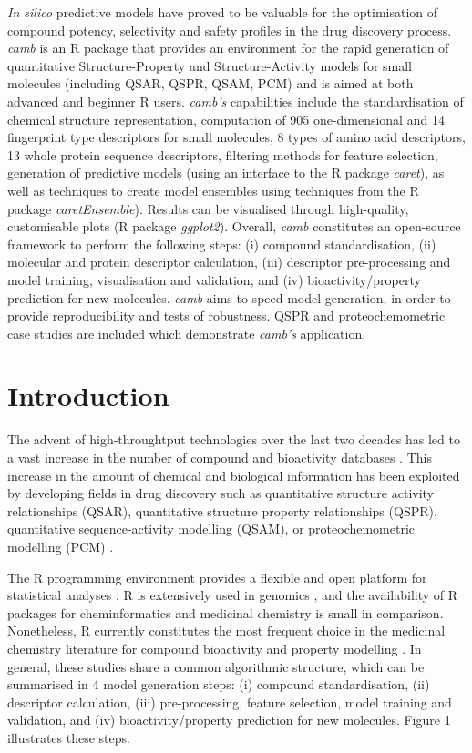 \documentclass[twoside,a4wide,10pt]{article}
\begin{document}
{\it In silico} predictive models have proved to be valuable for the optimisation of compound potency, selectivity and safety profiles in the drug discovery process.
{\it camb} is an R package that provides an environment for the rapid generation of quantitative Structure-Property and Structure-Activity models for small molecules (including QSAR, QSPR, QSAM, PCM) and is aimed at both advanced and beginner R users.
{\it camb's} capabilities include the standardisation of chemical structure representation, computation of 905 one-dimensional and 14 fingerprint type descriptors for small molecules, 8 types of amino acid descriptors, 13 whole protein sequence descriptors, filtering methods for feature selection, 
generation of predictive models (using an interface to the R package {\it caret}), as well as techniques to create model ensembles using techniques from the R package {\it caretEnsemble}).
Results can be visualised through high-quality, customisable plots (R package {\it ggplot2}).
Overall, {\it camb} constitutes an open-source framework to perform the following steps:
(i) compound standardisation, (ii) molecular and protein descriptor calculation, 
(iii) descriptor pre-processing and model training, visualisation and validation, 
and (iv) bioactivity/property prediction for new molecules.
{\it camb} aims to speed model generation, in order to provide reproducibility and tests of robustness. 
QSPR and proteochemometric case studies are included which demonstrate {\it camb's} application.

\section*{Introduction}

The advent of high-throughtput technologies over the last two decades 
has led to a vast increase in the number of compound and bioactivity databases \citep{bender_databases,chembl,pubchem}.
This increase in the amount of chemical and biological information 
has been exploited by developing fields in drug discovery 
such as quantitative structure activity relationships (QSAR), 
quantitative structure property relationships (QSPR), quantitative sequence-activity modelling (QSAM), 
or proteochemometric modelling (PCM) \citep{review_pcm,cortesReview}.

The R programming environment provides a flexible and open platform for statistical analyses \citep{Rlanguage}.
R is extensively used in genomics \citep{bioconductor},
and the availability of R packages for cheminformatics and medicinal chemistry is small in comparison.
Nonetheless, R currently constitutes the most frequent choice in the medicinal chemistry literature
for compound bioactivity and property modelling \citep{mente}.
In general, these studies share a common algorithmic structure, which can be summarised in 4 model generation steps:
(i) compound standardisation, (ii) descriptor calculation,
(iii) pre-processing, feature selection, model training and validation, and (iv) bioactivity/property prediction for new molecules.
Figure 1 illustrates these steps.
\end{document}
